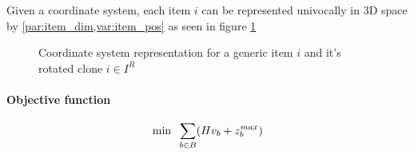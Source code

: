 Given a coordinate system, each item $i$ can be represented univocally in 3D space by \cref{par:item_dim,var:item_pos} as seen in figure \ref{fig:coordinate_system}
\begin{figure}
    \scalebox{0.65}{%
    
    }
    \caption{Coordinate system representation for a generic item $i$ and it's rotated clone $i \in I^R$ 
    \label{fig:coordinate_system}}
\end{figure}

\paragraph*{Objective function}
\begin{equation}
    \label{eq:objective}
    \min \hspace{.2cm} \sum_{b \in B} (H v_b + z^{max}_b)
\end{equation}

